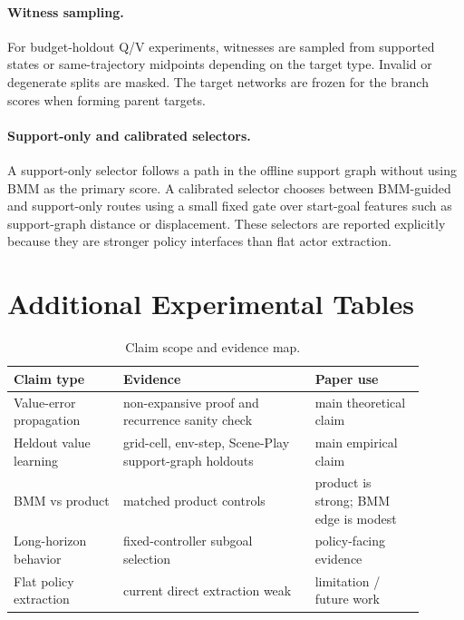 \documentclass[11pt]{article}
\begin{document}
\paragraph{Witness sampling.}
For budget-holdout Q/V experiments, witnesses are sampled from supported states
or same-trajectory midpoints depending on the target type. Invalid or degenerate
splits are masked. The target networks are frozen for the branch scores when
forming parent targets.

\paragraph{Support-only and calibrated selectors.}
A support-only selector follows a path in the offline support graph without using
BMM as the primary score. A calibrated selector chooses between BMM-guided and
support-only routes using a small fixed gate over start-goal features such as
support-graph distance or displacement. These selectors are reported explicitly
because they are stronger policy interfaces than flat actor extraction.

\section{Additional Experimental Tables}

\begin{table}[h]
\centering
\caption{Claim scope and evidence map.}
\label{tab:claim-scope}
\begin{tabular}{L{0.24\linewidth}L{0.42\linewidth}L{0.24\linewidth}}
\toprule
Claim type & Evidence & Paper use \\
\midrule
Value-error propagation & non-expansive proof and recurrence sanity check & main theoretical claim \\
Heldout value learning & grid-cell, env-step, Scene-Play support-graph holdouts & main empirical claim \\
BMM vs product & matched product controls & product is strong; BMM edge is modest \\
Long-horizon behavior & fixed-controller subgoal selection & policy-facing evidence \\
Flat policy extraction & current direct extraction weak & limitation / future work \\
\bottomrule
\end{tabular}
\end{table}
\end{document}

